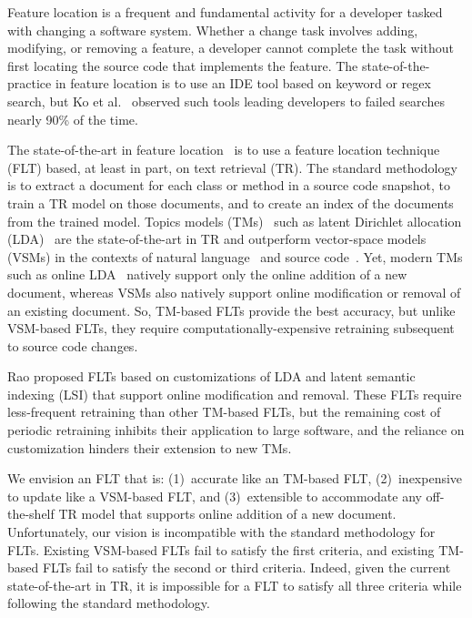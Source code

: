 
Feature location is a frequent and fundamental activity for a developer tasked with changing a software system.
Whether a change task involves adding, modifying, or removing a feature, a developer cannot complete the task without first locating the source code that implements the feature.
The state-of-the-practice in feature location is to use an IDE tool based on keyword or regex search, but Ko et al.~\cite{Ko-etal:2006} observed such tools leading developers to failed searches nearly 90\% of the time.

The state-of-the-art in feature location~\cite{Dit-etal:2011} is to use a feature location technique (FLT) based, at least in part, on text retrieval (TR).
The standard methodology~\cite{Marcus-etal:2004} is to extract a document for each class or method in a source code snapshot, to train a TR model on those documents, and to create an index of the documents from the trained model.
Topics models (TMs)~\cite{Blei:2012} such as latent Dirichlet allocation (LDA)~\cite{Blei-etal:2003} are the state-of-the-art in TR and outperform vector-space models (VSMs) in the contexts of natural language~\cite{Deerwester-etal:1990,Blei-etal:2003} and source code~\cite{Poshyvanyk-etal:2007,Lukins-etal:2010}.
Yet, modern TMs such as online LDA~\cite{Hoffman-etal:2010} natively support only the online addition of a new document, whereas VSMs also natively support online modification or removal of an existing document.
So, TM-based FLTs provide the best accuracy, but unlike VSM-based FLTs, they require computationally-expensive retraining subsequent to source code changes.

Rao\cite{Rao:2013} proposed FLTs based on customizations of LDA and latent semantic indexing (LSI) that support online modification and removal.
These FLTs require less-frequent retraining than other TM-based FLTs,
but the remaining cost of periodic retraining inhibits their application to large software, and the reliance on customization hinders their extension to new TMs.

We envision an FLT that is: (1)~accurate like an TM-based FLT, (2)~inexpensive to update like a VSM-based FLT, and (3)~extensible to accommodate any off-the-shelf TR model that supports online addition of a new document.
Unfortunately, our vision is incompatible with the standard methodology for FLTs.
Existing VSM-based FLTs fail to satisfy the first criteria, and existing TM-based FLTs fail to satisfy the second or third criteria.
Indeed, given the current state-of-the-art in TR, it is impossible for a FLT to satisfy all three criteria while following the standard methodology.

